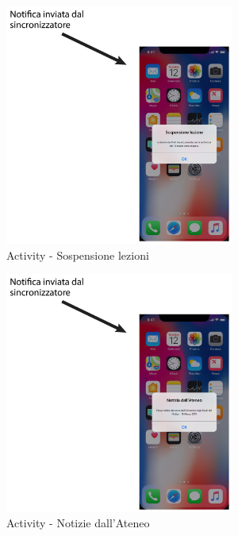 \begin{figure}
	\centering
	\includegraphics[width=0.67\textwidth]{imgs/gruppo2/activity-notifiche-sospensione-lezioni}
	\caption{Activity - Sospensione lezioni}
	\label{fig:activity-notifiche-sospensione-lezioni}
\end{figure}

\begin{figure}
	\centering
	\includegraphics[width=0.67\textwidth]{imgs/gruppo2/activity-notifiche-notizie-ateneo}
	\caption{Activity - Notizie dall'Ateneo}
	\label{fig:activity-notifiche-notizie-ateneo}
\end{figure}

